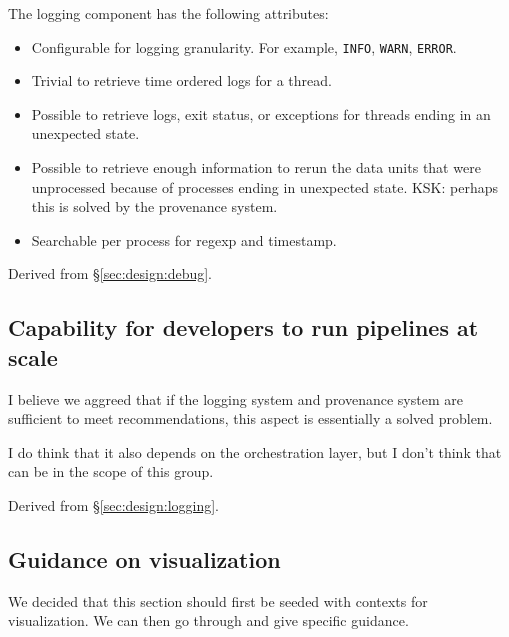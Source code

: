 The logging component has the following attributes:
\begin{itemize}
\item Configurable for logging granularity. For example, \texttt{INFO}, \texttt{WARN}, \texttt{ERROR}.
\item Trivial to retrieve time ordered logs for a thread.
\item Possible to retrieve logs, exit status, or exceptions for threads ending in an unexpected state.
\item Possible to retrieve enough information to rerun the data units that were unprocessed because of processes ending in unexpected state.  KSK: perhaps this is solved by the provenance system.
\item Searchable per process for regexp and timestamp.
\end{itemize}

Derived from \S\ref{sec:design:debug}.

\subsection{Capability for developers to run pipelines at scale}


I believe we aggreed that if the logging system and provenance system are sufficient to meet recommendations, this aspect is essentially a solved problem.

I do think that it also depends on the orchestration layer, but I don't think that can be in the scope of this group.

Derived from \S\ref{sec:design:logging}.

\subsection{Guidance on visualization}

We decided that this section should first be seeded with contexts for visualization. We can then go through and give specific guidance.

